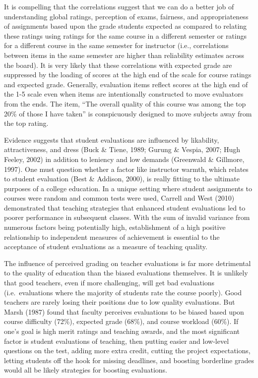 \documentclass[,man,mask]{apa6}
\begin{document}
It is compelling that the correlations suggest that we can do a better job of understanding global ratings, perception of exams, fairness, and appropriateness of assignments based upon the grade students expected as compared to relating these ratings using ratings for the same course in a different semester or ratings for a different course in the same semester for instructor (i.e., correlations between items in the same semester are higher than reliability estimates across the board). It is very likely that these correlations with expected grade are suppressed by the loading of scores at the high end of the scale for course ratings and expected grade. Generally, evaluation items reflect scores at the high end of the 1-5 scale even when items are intentionally constructed to move evaluators from the ends. The item, \enquote{The overall quality of this course was among the top 20\% of those I have taken} is conspicuously designed to move subjects away from the top rating.

Evidence suggests that student evaluations are influenced by likability, attractiveness, and dress (Buck \& Tiene, 1989; Gurung \& Vespia, 2007; Hugh Feeley, 2002) in addition to leniency and low demands (Greenwald \& Gillmore, 1997). One must question whether a factor like instructor warmth, which relates to student evaluation (Best \& Addison, 2000), is really fitting to the ultimate purposes of a college education. In a unique setting where student assignments to courses were random and common tests were used, Carrell and West (2010) demonstrated that teaching strategies that enhanced student evaluations led to poorer performance in subsequent classes. With the sum of invalid variance from numerous factors being potentially high, establishment of a high positive relationship to independent measures of achievement is essential to the acceptance of student evaluations as a measure of teaching quality.

The influence of perceived grading on teacher evaluations is far more detrimental to the quality of education than the biased evaluations themselves. It is unlikely that good teachers, even if more challenging, will get bad evaluations (i.e.~evaluations where the majority of students rate the course poorly). Good teachers are rarely losing their positions due to low quality evaluations. But Marsh (1987) found that faculty perceives evaluations to be biased based upon course difficulty (72\%), expected grade (68\%), and course workload (60\%). If one's goal is high merit ratings and teaching awards, and the most significant factor is student evaluations of teaching, then putting easier and low-level questions on the test, adding more extra credit, cutting the project expectations, letting students off the hook for missing deadlines, and boosting borderline grades would all be likely strategies for boosting evaluations.
\end{document}
